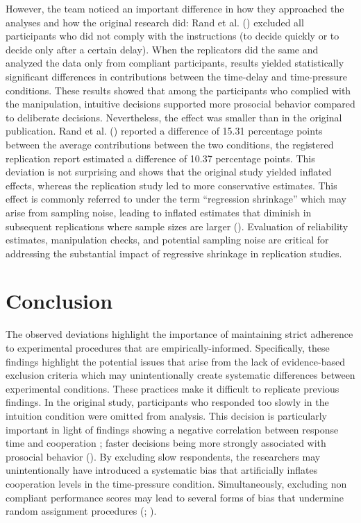 \documentclass[
  letterpaper,
]{book}
\begin{document}
However, the team noticed an important difference in how they approached
the analyses and how the original research did: Rand et al.
() excluded all participants
who did not comply with the instructions (to decide quickly or to decide
only after a certain delay). When the replicators did the same and
analyzed the data only from compliant participants, results yielded
statistically significant differences in contributions between the
time-delay and time-pressure conditions. These results showed that among
the participants who complied with the manipulation, intuitive decisions
supported more prosocial behavior compared to deliberate decisions.
Nevertheless, the effect was smaller than in the original publication.
Rand et al. () reported a
difference of 15.31 percentage points between the average contributions
between the two conditions, the registered replication report estimated
a difference of 10.37 percentage points. This deviation is not
surprising and shows that the original study yielded inflated effects,
whereas the replication study led to more conservative estimates. This
effect is commonly referred to under the term ``regression shrinkage''
which may arise from sampling noise, leading to inflated estimates that
diminish in subsequent replications where sample sizes are larger
().
Evaluation of reliability estimates, manipulation checks, and potential
sampling noise are critical for addressing the substantial impact of
regressive shrinkage in replication studies.

\section{Conclusion}\label{conclusion-20}

The observed deviations highlight the importance of maintaining strict
adherence to experimental procedures that are empirically-informed.
Specifically, these findings highlight the potential issues that arise
from the lack of evidence-based exclusion criteria which may
unintentionally create systematic differences between experimental
conditions. These practices make it difficult to replicate previous
findings. In the original study, participants who responded too slowly
in the intuition condition were omitted from analysis. This decision is
particularly important in light of findings showing a negative
correlation between response time and cooperation ; faster decisions
being more strongly associated with prosocial behavior
(). By excluding
slow respondents, the researchers may unintentionally have introduced a
systematic bias that artificially inflates cooperation levels in the
time-pressure condition. Simultaneously, excluding non compliant
performance scores may lead to several forms of bias that undermine
random assignment procedures (; ).
\end{document}
